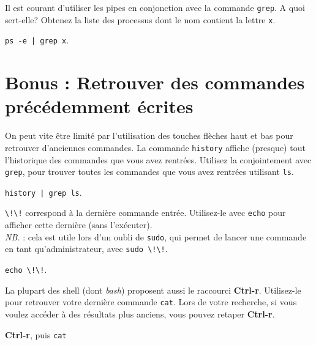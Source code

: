 \documentclass{scrartcl}
\begin{document}
\begin{question}[name=Q.]
	Il est courant d'utiliser les pipes en conjonction avec la commande \lstinline|grep|. A quoi sert-elle? Obtenez la liste des processus dont le nom contient la lettre \lstinline|x|.
\end{question}
\begin{solution}
	\lstinline$ps -e | grep x$.
\end{solution}

\section{Bonus : Retrouver des commandes précédemment écrites}

\begin{question}[name=Q.]
	On peut vite être limité par l'utilisation des touches flèches haut et bas pour retrouver d'anciennes commandes. La commande \lstinline|history| affiche (presque) tout l'historique des commandes que vous avez rentrées. Utilisez la conjointement avec \lstinline|grep|, pour trouver toutes les commandes que vous avez rentrées utilisant \lstinline|ls|.
\end{question}
\begin{solution}
	\lstinline$history | grep ls$.
\end{solution}

\begin{question}[name=Q.]
	\lstinline|\!\!| correspond à la dernière commande entrée. Utilisez-le avec \lstinline|echo| pour afficher cette dernière (sans l'exécuter). \\
	\textit{NB.} : cela est utile lors d'un oubli de \lstinline|sudo|, qui permet de lancer une commande en tant qu'administrateur, avec  \lstinline|sudo \!\!|.
\end{question}
\begin{solution}
	\lstinline|echo \!\!|.
\end{solution}

\begin{question}[name=Q.]
	La plupart des shell (dont \textit{bash}) proposent aussi le raccourci \textbf{Ctrl-r}. Utilisez-le pour retrouver votre dernière commande \lstinline|cat|. Lors de votre recherche, si vous voulez accéder à des résultats plus anciens, vous pouvez retaper \textbf{Ctrl-r}.
\end{question}
\begin{solution}
	\textbf{Ctrl-r}, puis \lstinline|cat|
\end{solution}
\end{document}
